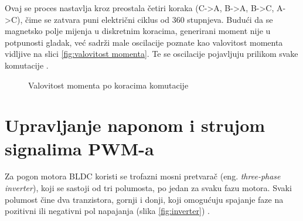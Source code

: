 \documentclass[diplomskirad]{fer}
\begin{document}
Ovaj se proces nastavlja kroz preostala četiri koraka (C->A, B->A, B->C, A->C),
čime se zatvara puni električni ciklus od 360 stupnjeva.
Budući da se magnetsko polje mijenja u diskretnim koracima, generirani moment
nije u potpunosti gladak, već sadrži male oscilacije poznate kao valovitost
momenta vidljive na slici \ref{fig:valovitost momenta}. Te se oscilacije
pojavljuju prilikom svake komutacije \cite{TI2015}. \label{trap:torque-ripple}
\begin{figure}[h!]
	\centering
	\caption{Valovitost momenta po koracima komutacije}
	\label{fig:valovitost_momenta}
\end{figure}
\newpage

\section{Upravljanje naponom i strujom signalima PWM-a}
\label{sec:trofazno_upravljanje}

Za pogon motora BLDC koristi se trofazni mosni pretvarač (eng.
\textit{three-phase inverter}), koji se sastoji od tri polumosta, po jedan za
svaku fazu motora. Svaki polumost čine dva tranzistora, gornji i donji, koji
omogućuju spajanje faze na pozitivni ili negativni pol napajanja (slika
\ref{fig:inverter}) \cite{TI2015,ST_AN1946,MicrochipAN885}.
\end{document}
